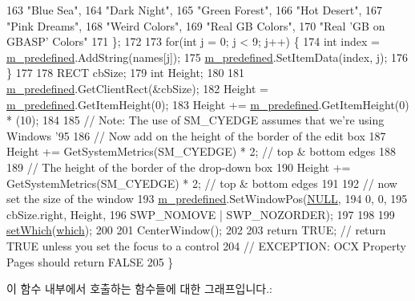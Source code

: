 \begin{DoxyCode}
163     \textcolor{stringliteral}{"Blue Sea"},
164     \textcolor{stringliteral}{"Dark Night"},
165     \textcolor{stringliteral}{"Green Forest"},
166     \textcolor{stringliteral}{"Hot Desert"},
167     \textcolor{stringliteral}{"Pink Dreams"},
168     \textcolor{stringliteral}{"Weird Colors"},
169     \textcolor{stringliteral}{"Real GB Colors"},
170     \textcolor{stringliteral}{"Real 'GB on GBASP' Colors"}
171   \};
172 
173   \textcolor{keywordflow}{for}(\textcolor{keywordtype}{int} j = 0; j < 9; j++) \{
174     \textcolor{keywordtype}{int} index = \mbox{\hyperlink{class_g_b_color_dlg_abd7ea64ca037d12cec0615ef7872c66b}{m\_predefined}}.AddString(names[j]);
175     \mbox{\hyperlink{class_g_b_color_dlg_abd7ea64ca037d12cec0615ef7872c66b}{m\_predefined}}.SetItemData(index, j);
176   \}
177 
178   RECT cbSize;
179   \textcolor{keywordtype}{int} Height;
180   
181   \mbox{\hyperlink{class_g_b_color_dlg_abd7ea64ca037d12cec0615ef7872c66b}{m\_predefined}}.GetClientRect(&cbSize);
182   Height = \mbox{\hyperlink{class_g_b_color_dlg_abd7ea64ca037d12cec0615ef7872c66b}{m\_predefined}}.GetItemHeight(0);
183   Height += \mbox{\hyperlink{class_g_b_color_dlg_abd7ea64ca037d12cec0615ef7872c66b}{m\_predefined}}.GetItemHeight(0) * (10);
184   
185   \textcolor{comment}{// Note: The use of SM\_CYEDGE assumes that we're using Windows '95}
186   \textcolor{comment}{// Now add on the height of the border of the edit box}
187   Height += GetSystemMetrics(SM\_CYEDGE) * 2;  \textcolor{comment}{// top & bottom edges}
188   
189   \textcolor{comment}{// The height of the border of the drop-down box}
190   Height += GetSystemMetrics(SM\_CYEDGE) * 2;  \textcolor{comment}{// top & bottom edges}
191   
192   \textcolor{comment}{// now set the size of the window}
193   \mbox{\hyperlink{class_g_b_color_dlg_abd7ea64ca037d12cec0615ef7872c66b}{m\_predefined}}.SetWindowPos(\mbox{\hyperlink{getopt1_8c_a070d2ce7b6bb7e5c05602aa8c308d0c4}{NULL}},
194                             0, 0,
195                             cbSize.right, Height,
196                             SWP\_NOMOVE | SWP\_NOZORDER);
197 
198 
199   \mbox{\hyperlink{class_g_b_color_dlg_a1e00eaaeaf344a830f1dd5692e26af1d}{setWhich}}(\mbox{\hyperlink{class_g_b_color_dlg_a8f7bbf1c4a4ffe4a6c57454b9087ff28}{which}});
200 
201   CenterWindow();
202   
203   \textcolor{keywordflow}{return} TRUE;  \textcolor{comment}{// return TRUE unless you set the focus to a control}
204                 \textcolor{comment}{// EXCEPTION: OCX Property Pages should return FALSE}
205 \}
\end{DoxyCode}
이 함수 내부에서 호출하는 함수들에 대한 그래프입니다.\+:
